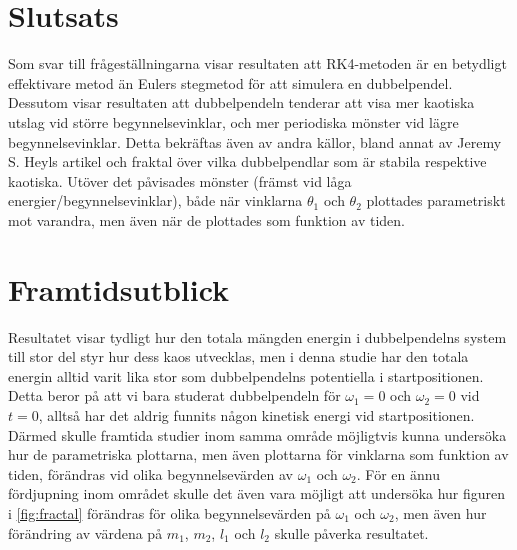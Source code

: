 \section{Slutsats}

Som svar till frågeställningarna visar resultaten att RK4-metoden är en betydligt effektivare metod än Eulers stegmetod för att simulera en dubbelpendel. Dessutom visar resultaten att dubbelpendeln tenderar att visa mer kaotiska utslag vid större begynnelsevinklar, och mer periodiska mönster vid lägre begynnelsevinklar.  Detta bekräftas även av andra källor, bland annat av Jeremy S. Heyls artikel \cite{heyl2008double} och fraktal över vilka dubbelpendlar som är stabila respektive kaotiska. Utöver det påvisades mönster (främst vid låga energier/begynnelsevinklar), både när vinklarna $\theta_1$ och $\theta_2$ plottades parametriskt mot varandra, men även när de plottades som funktion av tiden. 

\section{Framtidsutblick}


Resultatet visar tydligt hur den totala mängden energin i dubbelpendelns system till stor del styr hur dess kaos utvecklas, men i denna studie har den totala energin alltid varit lika stor som dubbelpendelns potentiella i startpositionen. Detta beror på att vi bara studerat dubbelpendeln för $\omega_1 = 0$ och $\omega_2 = 0$ vid $t=0$, alltså har det aldrig funnits någon kinetisk energi vid startpositionen. Därmed skulle framtida studier inom samma område möjligtvis kunna undersöka hur de parametriska plottarna, men även plottarna för vinklarna som funktion av tiden, förändras vid olika begynnelsevärden av $\omega_1$ och $\omega_2$. För en ännu fördjupning inom området skulle det även vara möjligt att undersöka hur figuren i \ref{fig:fractal} förändras för olika begynnelsevärden på $\omega_1$ och $\omega_2$, men även hur förändring av värdena på $m_1$, $m_2$, $l_1$ och $l_2$ skulle påverka resultatet. 




